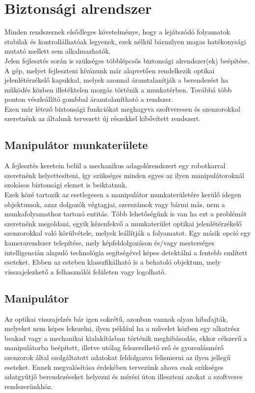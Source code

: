 \documentclass{article}
\begin{document}
\section{Biztonsági alrendszer}
Minden rendszernek elsődleges követelménye, hogy a lejátszódó folyamatok stabilak és kontrollálhatóak legyenek, ezek nélkül bármilyen magas hatékonysági mutató mellett sem alkalmazhatók.\\
Jelen fejlesztés során is szükséges többlépcsős biztonsági alrendszer(ek) beépítése.\\
A gép, melyet fejleszteni kívánunk már alapvetően rendelkezik optikai jelenlétérzékelő kapukkal, melyek azonnal áramtalanítják a berendezést ha működés közben illetéktelen mozgás történik a munkatérben. Továbbá több ponton vészleállító gombbal áramtalanítható a rendszer.\vspace{5pt}\\
Ezen már létező biztonsági funkciókat meghagyva szoftveresen és szenzorokkal szeretnénk az általunk tervezett új részekkel kibővített rendszert.
\subsection{Manipulátor munkaterülete}
A fejlesztés keretein belül a mechanikus adagolórendszert egy robotkarral szeretnénk helyettesíteni, így szükséges minden egyes az ilyen manipulátoroknál szokásos biztonsági elemet is beiktatnuk.\\
Ezek közé tartozik az esetlegesen a manipulátor munkaterületére kerülő idegen objektumok, azaz dolgozók végtagjai, szerszámok vagy bármi más, nem a munkafolyamathoz tartozó entitás. Több lehetőségünk is van ha ezt a problémát szeretnénk megoldani, egyik kézenfekvő a munkaterület optikai jelenlétérzékelő szenzorokkal
való körülvétele, melyek leállítják a folyamatot. Egy másik opció egy kamerarendszer telepítése, mely képfeldolgozáson és/vagy mesterséges intelligencián alapuló technológia segítségével képes detektálni a fentebb említett eseteket. Ebben az esteben klasszfikálható is a behatoló objektum, mely visszajelezhető a felhasználói felületen vagy logolható.

\subsection{Manipulátor}
Az optikai visszajelzés bár igen sokrétű, azonban vannak olyan hibafajták, melyeket nem képes lekezelni, ilyen például ha a művelet közben egy alkatrész beakad vagy a mechanikai kialakításban történik meghibásodás, ekkor célszerű a manipulátorba beépített, illetve utólag felszerelhető
erő és gyorsulásmérő szenzorok által szolgáltatott adatokat feldolgozva felismerni az ilyen jellegű eseteket. Ennek megvalósítása érdekében tervezünk ahova csak szükséges adatgyűtjő berendezéseket helyezni és mérési úton illeszteni azokat a szoftveres rendszerünkhöz.
\end{document}
